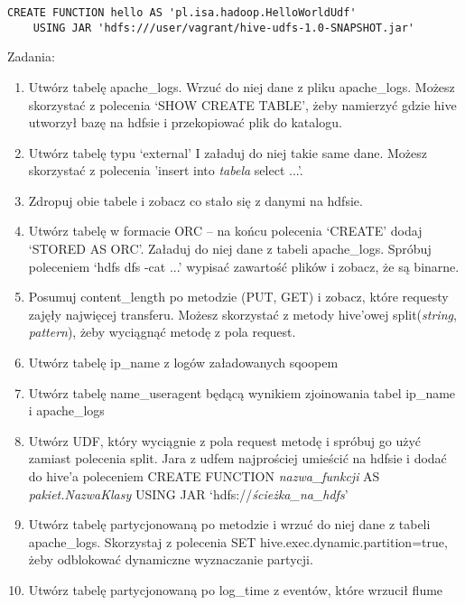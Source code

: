 \documentclass[11pt]{article}
\begin{document}
\begin{lstlisting}
CREATE FUNCTION hello AS 'pl.isa.hadoop.HelloWorldUdf'
	USING JAR 'hdfs:///user/vagrant/hive-udfs-1.0-SNAPSHOT.jar'
\end{lstlisting}

\pagebreak

Zadania:
\begin{enumerate}
\item Utwórz tabelę apache\_logs. Wrzuć do niej dane z pliku apache\_logs. Możesz skorzystać z polecenia ‘SHOW CREATE TABLE’, żeby namierzyć gdzie hive utworzył bazę na hdfsie i przekopiować plik do katalogu.
\item Utwórz tabelę typu ‘external’ I załaduj do niej takie same dane. Możesz skorzystać z polecenia 'insert into \textit{tabela} select ...'.
\item Zdropuj obie tabele i zobacz co stało się z danymi na hdfsie.
\item Utwórz tabelę w formacie ORC – na końcu polecenia ‘CREATE’ dodaj ‘STORED AS ORC’. Załaduj do niej dane z tabeli apache\_logs. Spróbuj poleceniem ‘hdfs dfs -cat ...’ wypisać zawartość plików i zobacz, że są binarne.
\item Posumuj content\_length po metodzie (PUT, GET) i zobacz, które requesty zajęły najwięcej transferu. Możesz skorzystać z metody hive’owej split(\textit{string}, \textit{pattern}), żeby wyciągnąć metodę z pola request.
\item Utwórz tabelę ip\_name z logów załadowanych sqoopem
\item Utwórz tabelę name\_useragent będącą wynikiem zjoinowania tabel ip\_name i apache\_logs
\item Utwórz UDF, który wyciągnie z pola request metodę i spróbuj go użyć zamiast polecenia split. Jara z udfem najprościej umieścić na hdfsie i dodać do hive’a poleceniem CREATE FUNCTION \textit{nazwa\_funkcji} AS \textit{pakiet.NazwaKlasy} USING JAR ‘hdfs://\textit{ścieżka\_na\_hdfs}’
\item Utwórz tabelę partycjonowaną po metodzie i wrzuć do niej dane z tabeli apache\_logs. Skorzystaj z polecenia SET hive.exec.dynamic.partition=true, żeby odblokować dynamiczne wyznaczanie partycji.
\item Utwórz tabelę partycjonowaną po log\_time z eventów, które wrzucił flume
\end{enumerate}
\end{document}
